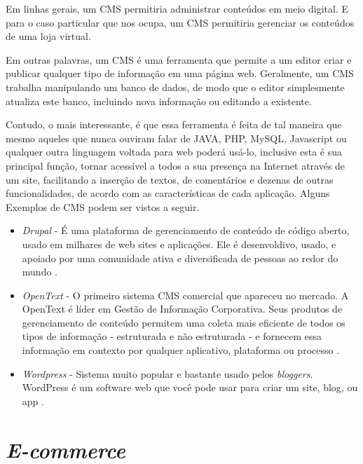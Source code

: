 \documentclass[a4paper,12pt]{monografia}
\begin{document}
Em linhas gerais, um CMS permitiria administrar conteúdos em meio digital. E para o caso particular que nos ocupa, um CMS permitiria gerenciar os conteúdos de uma loja virtual.

Em outras palavras, um CMS é uma ferramenta que permite a um editor criar e publicar qualquer tipo de informação em uma página web. Geralmente, um CMS trabalha manipulando um banco de dados, de modo que o editor simplesmente atualiza este banco, incluindo nova informação ou editando a existente.

Contudo, o mais interessante, é que essa ferramenta é feita de tal maneira que mesmo aqueles que nunca ouviram falar de JAVA, PHP, MySQL, Javascript ou qualquer outra linguagem voltada para web poderá usá-lo, inclusive esta é sua principal função, tornar acessível a todos a sua presença na Internet através de um site, facilitando a inserção de textos, de comentários e dezenas de outras funcionalidades, de acordo com as características de cada aplicação. Alguns Exemplos de CMS podem ser vistos a seguir.

\begin{itemize}
\item \textit{Drupal} - É uma plataforma de gerenciamento de conteúdo de código aberto, usado em milhares de web sites e aplicações. Ele é desenvoldivo, usado, e apoiado por uma comunidade ativa e diversificada de pessoas ao redor do mundo \cite{drupal}.

\item \textit{OpenText} \citeyear{opentext} - O primeiro sistema CMS comercial que apareceu no mercado. A OpenText é líder em Gestão de Informação Corporativa. Seus produtos de gerenciamento de conteúdo permitem uma coleta mais eficiente de todos os tipos de informação - estruturada e não estruturada - e fornecem essa informação em contexto por qualquer aplicativo, plataforma ou processo \cite{opentext}.

\item \textit{Wordpress} - Sistema muito popular e bastante usado pelos \textit{bloggers}. WordPress é um software web que você pode usar para criar um site, blog, ou app \cite{wordpress}.
\end{itemize}


\section{\textit{E-commerce}} %
\label{sec:e_commerce} 
\end{document}
